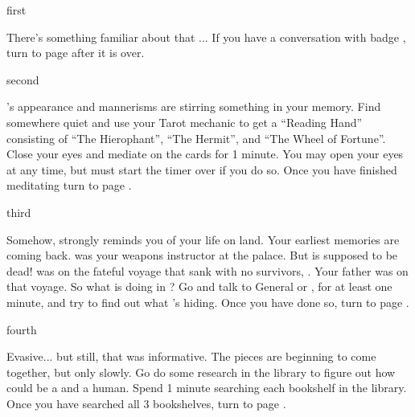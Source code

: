 \documentclass[greennotebook]{NeptuneBall}
\begin{document}

\startnotebook{\nShipwreck{}}

\begin{page}{first}

There's something familiar about that \cGeneral{\mer}... If you have a conversation with badge \cGeneral{\MYnumber}, turn to page  after it is over.

\end{page}

\begin{page}{second}

\cGeneral{}'s appearance and mannerisms are stirring something in your memory. Find somewhere quiet and use your Tarot mechanic to get a ``Reading Hand'' consisting of ``The Hierophant'', ``The Hermit'', and ``The Wheel of Fortune''. Close your eyes and mediate on the cards for 1 minute. You may open your eyes at any time, but must start the timer over if you do so. Once you have finished meditating turn to page .

\end{page}

\begin{page}{third}

Somehow, \cGeneral{} strongly reminds you of your life on land. Your earliest memories are coming back. \cGeneral{} was your weapons instructor at the palace. But \cGeneral{\they} is supposed to be dead! \cGeneral{} was on the fateful voyage that sank with no survivors, \cKraken{\MYname}. Your father was on that voyage. So what is \cGeneral{} doing in \pAtlantis{}? Go and talk to General \cGeneral{} or \cGeneral{\their} \cQueen{\spouse}, \cQueen{} for at least one minute, and try to find out what \cGeneral{\they}'s hiding.  Once you have done so, turn to page .

\end{page}

\begin{page}{fourth}

Evasive... but still, that was informative. The pieces are beginning to come together, but only slowly. Go do some research in the library to figure out how \cGeneral{} could be a \cGeneral{\mer} and a human. Spend 1 minute searching each bookshelf in the library. Once you have searched all 3 bookshelves, turn to page .

\end{page}
\end{document}
